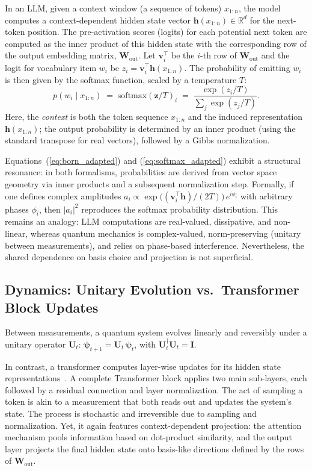 \documentclass[%
  reprint,
  superscriptaddress,
  showpacs,
  showkeys,
  amsmath,amssymb,
  pra,
  longbibliography,
  floatfix,
  x11names
]{revtex4-2}
\begin{document}
In an LLM, given a context window (a sequence of tokens) $x_{1:n}$, the model computes a context-dependent hidden state vector $\bm{h}(x_{1:n}) \in \mathbb{R}^{d}$ for the next-token position. The pre-activation scores (logits) for each potential next token are computed as the inner product of this hidden state with the corresponding row of the output embedding matrix, $\bm{W}_{\text{out}}$. Let $\bm{v}_i^\intercal$ be the $i$-th row of $\bm{W}_{\text{out}}$ and the logit for vocabulary item $w_i$ be $z_i = \bm{v}_i^\intercal \bm{h}(x_{1:n})$. The probability of emitting $w_i$ is then given by the softmax function, scaled by a temperature $T$:
\begin{equation}
    p(w_i \mid x_{1:n}) \;=\; \mathrm{softmax}(\bm{z}/T)_i \;=\; \frac{\exp(z_i/T)}{\sum_{j} \exp(z_j/T)}.
    \label{eq:softmax_adapted}
\end{equation}
Here, the \emph{context} is both the token sequence $x_{1:n}$ and the induced representation $\bm{h}(x_{1:n})$; the output probability is determined by an inner product (using the standard transpose for real vectors), followed by a Gibbs normalization.

Equations~(\ref{eq:born_adapted}) and (\ref{eq:softmax_adapted}) exhibit a structural resonance: in both formalisms, probabilities are derived from vector space geometry via inner products and a subsequent normalization step. Formally, if one defines complex amplitudes $a_i \propto \exp\bigl((\bm{v}_i^\intercal \bm{h})/(2T)\bigr)\,e^{i\phi_i}$ with arbitrary phases $\phi_i$, then $|a_i|^{2}$ reproduces the softmax probability distribution. This remains an analogy: LLM computations are real-valued, dissipative, and non-linear, whereas quantum mechanics is complex-valued, norm-preserving (unitary between measurements), and relies on phase-based interference. Nevertheless, the shared dependence on basis choice and projection is not superficial.

\subsection{Dynamics: Unitary Evolution vs.\ Transformer Block Updates}

Between measurements, a quantum system evolves linearly and reversibly under a unitary operator $\bm{U}_t$:
$\bm{\psi}_{t+1} = \bm{U}_t \, \bm{\psi}_t$, with $\bm{U}_t^\dagger \bm{U}_t = \bm{I}$.


In contrast, a transformer computes layer-wise updates for its hidden state representations~\cite{li-2024,zhang2025surveyquantumtransformersarchitectures}.
A complete Transformer block applies two main sub-layers,
each followed by a residual connection and layer normalization.
The act of sampling a token is akin to
a measurement that both reads out and updates the system's state.
The process is stochastic and irreversible due to sampling and normalization.
Yet, it again features context-dependent projection: the attention mechanism pools information based on dot-product similarity, and the output layer projects the final hidden state onto basis-like directions defined by the rows of $\bm{W}_{\text{out}}$.
\end{document}
